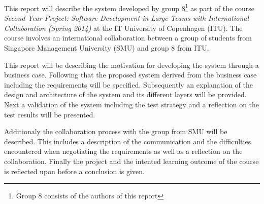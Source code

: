 \documentclass[../report.tex]{subfiles}
\begin{document}
This report will describe the system developed by group 8\footnote{Group 8 consists of the authors of this report} as part of the course \textit{Second Year Project: Software Development in Large Teams with International Collaboration (Spring 2014)} at the IT University of Copenhagen (ITU). The course involves an international collaboration between a group of students from Singapore Management University (SMU) and group 8 from ITU.

This report will be describing the motivation for developing the system through a business case. Following that the proposed system derived from the business case including the requirements will be specified. Subsequently an explanation of the design and architecture of the system and its different layers will be provided. Next a validation of the system including the test strategy and a reflection on the test results will be presented. 

Additionaly the collaboration process with the group from SMU will be described. This includes a description of the communication and the difficulties encountered when negotiating the requirements as well as a reflection on the collaboration. Finally the project and the intented learning outcome of the course is reflected upon before a conclusion is given.




\end{document}
